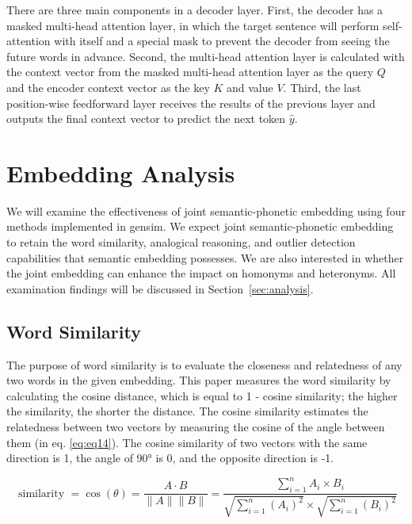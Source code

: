 There are three main components in a decoder layer. First, the decoder has a masked multi-head attention layer, in which the target sentence will perform self-attention with itself and a special mask to prevent the decoder from seeing the future words in advance. Second, the multi-head attention layer is calculated with the context vector from the masked multi-head attention layer as the query $Q$ and the encoder context vector as the key $K$ and value $V$. Third, the last position-wise feedforward layer receives the results of the previous layer and outputs the final context vector to predict the next token $\hat{y}$.

\section{Embedding Analysis} \label{sec:embedding_analysis}

We will examine the effectiveness of joint semantic-phonetic embedding using four methods implemented in gensim. We expect joint semantic-phonetic embedding to retain the word similarity, analogical reasoning, and outlier detection capabilities that semantic embedding possesses. We are also interested in whether the joint embedding can enhance the impact on homonyms and heteronyms. All examination findings will be discussed in Section~\ref{sec:analysis}.


\subsection{Word Similarity} \label{sec:similarity}

The purpose of word similarity is to evaluate the closeness and relatedness of any two words in the given embedding. This paper measures the word similarity by calculating the cosine distance, which is equal to 1 - cosine similarity; the higher the similarity, the shorter the distance. The cosine similarity estimates the relatedness between two vectors by measuring the cosine of the angle between them (in eq. \ref{eq:eq14}). The cosine similarity of two vectors with the same direction is 1, the angle of 90° is 0, and the opposite direction is -1.

\begin{equation}
    \text { similarity }=\cos (\theta)=\frac{A \cdot B}{\|A\|\|B\|}=\frac{\sum_{i=1}^{n} A_{i} \times B_{i}}{\sqrt{\sum_{i=1}^{n}\left(A_{i}\right)^{2}} \times \sqrt{\sum_{i=1}^{n}\left(B_{i}\right)^{2}}} \label{eq:eq14}
\end{equation}

